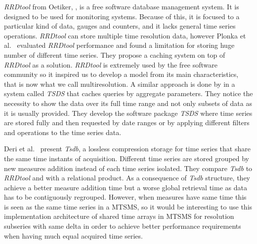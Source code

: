 \emph{RRDtool} from Oetiker, \cite{rrdtool,lisa98:oetiker}, is a free
software database management system. It is designed to be used for
monitoring systems. Because of this, it is focused to a particular
kind of data, gauges and counters, and it lacks general time series
operations. \emph{RRDtool} can store multiple time resolution data,
however Plonka et al.\ \cite{lisa07:plonka} evaluated \emph{RRDtool}
performance and found a limitation for storing huge number of
different time series. They propose a caching system on top of
\emph{RRDtool} as a solution.  \emph{RRDtool} is extremely used by the
free software community so it inspired us to develop a model from its
main characteristics, that is now what we call multiresolution. A
similar approach is done by \cite{weigel10} in a system called
\emph{TSDS} that caches queries by aggregate parameters. They notice
the necessity to show the data over its full time range and not only
subsets of data as it is usually provided.  They develop the software
package \emph{TSDS} where time series are stored fully and then
requested by date ranges or by applying different filters and
operations to the time series data.



Deri et al.\ \cite{deri12:tsdb_compressed_database} present
\emph{Tsdb}, a lossless compression storage  for time
series that share the same time instants of acquisition. Different
time series are stored grouped by new measures addition instead of
each time series isolated.  They compare \emph{Tsdb} to \emph{RRDtool} and
with a relational product. As a consequence of \emph{Tsdb} structure,
they achieve a better measure addition time but a worse global
retrieval time as data has to be contiguously regrouped. However, when
measures have same time this is seen as the same time series in a
MTSMS, so it would be interesting to use this implementation
architecture of shared time arrays in MTSMS for resolution subseries
with same delta in order to achieve better performance requirements
when having much equal acquired time series.



